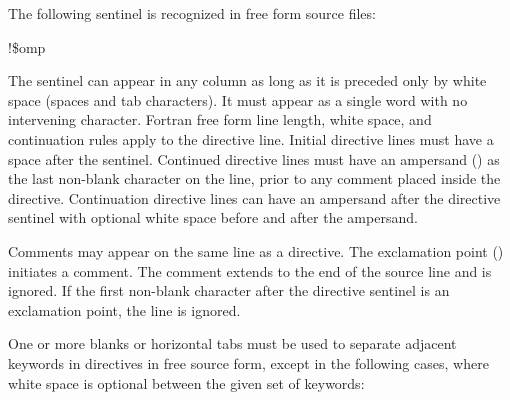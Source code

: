 The following sentinel is recognized in free form source files:

\begin{boxedcode}
!\$omp
\end{boxedcode}

The sentinel can appear in any column as long as it is preceded only by white space 
(spaces and tab characters). It must appear as a single word with no intervening 
character. Fortran free form line length, white space, and continuation rules apply to the 
directive line. Initial directive lines must have a space after the sentinel. Continued 
directive lines must have an ampersand (\code{\&}) as the last non-blank character on the line, 
prior to any comment placed inside the directive. Continuation directive lines can have 
an ampersand after the directive sentinel with optional white space before and after the 
ampersand.

Comments may appear on the same line as a directive. The exclamation point (\code{!}) 
initiates a comment. The comment extends to the end of the source line and is ignored. 
If the first non-blank character after the directive sentinel is an exclamation point, the 
line is ignored.

One or more blanks or horizontal tabs must be used to separate adjacent keywords in 
directives in free source form, except in the following cases, where white space is 
optional between the given set of keywords:

\begin{figure}[t!]
\end{figure}

